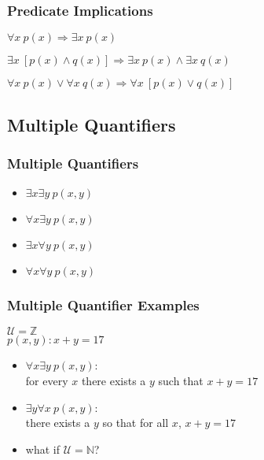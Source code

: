 \documentclass[dvipsnames]{beamer}
\begin{document}
\begin{frame}
  \frametitle{Predicate Implications}

  \begin{theorem}
    $\forall x~p(x) \Rightarrow \exists x~p(x)$
  \end{theorem}

  \pause
  \begin{theorem}
    $\exists x~[p(x) \wedge q(x)]
      \Rightarrow \exists x~p(x) \wedge \exists x~q(x)$
  \end{theorem}

  \pause
  \begin{theorem}
    $\forall x~p(x) \vee \forall x~q(x)
      \Rightarrow \forall x~[p(x) \vee q(x)]$
  \end{theorem}
\end{frame}

\subsection{Multiple Quantifiers}

\begin{frame}
  \frametitle{Multiple Quantifiers}

  \begin{itemize}
    \item $\exists x \exists y~p(x,y)$
    \item $\forall x \exists y~p(x,y)$
    \item $\exists x \forall y~p(x,y)$
    \item $\forall x \forall y~p(x,y)$
  \end{itemize}
\end{frame}

\begin{frame}
  \frametitle{Multiple Quantifier Examples}

  \begin{example}
    $\mathcal{U}=\mathbb{Z}$\\
    $p(x,y): x+y=17$

    \begin{itemize}
      \pause
      \item $\forall x \exists y~p(x,y)$:\\
        for every $x$ there exists a $y$ such that $x+y=17$

      \pause
      \item $\exists y \forall x~p(x,y)$:\\
        there exists a $y$ so that for all $x$,  $x+y=17$

      \pause
      \bigskip
      \item what if $\mathcal{U}=\mathbb{N}$?
    \end{itemize}
  \end{example}
\end{frame}
\end{document}
